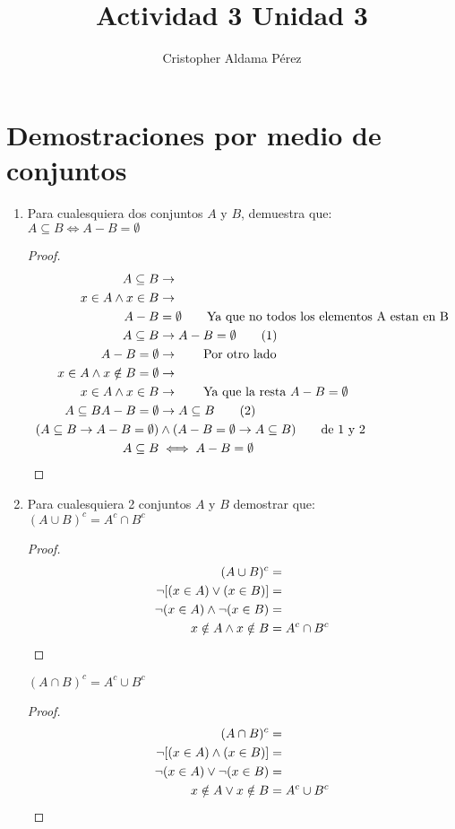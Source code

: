 \documentclass[a4paper,10pt]{article}
\title{Actividad 3 Unidad 3}
\author{Cristopher Aldama Pérez}
\begin{document}
\maketitle

\section{Demostraciones por medio de conjuntos}

\begin{enumerate}
 \item Para cualesquiera dos conjuntos $A$ y $B$, demuestra que:
 \\ $A \subseteq B \iff A - B = \emptyset $
 \begin{proof}
  \begin{align*}
  A \subseteq B &\to
  \\ x \in A \land x \in B &\to
  \\A - B &= \emptyset \tag*{Ya que no todos los elementos A estan en B}
  \\A \subseteq B &\to A - B = \emptyset \tag{1}
  \\A - B = \emptyset&\to \tag*{Por otro lado}
  \\x \in A \land x \notin B = \emptyset&\to
  \\ x \in A \land x \in B&\to     \tag*{Ya que la resta $A - B = \emptyset$}
  \\ A \subseteq B
  A - B = \emptyset &\to A \subseteq B \tag{2}
  \\(A \subseteq B \to A - B = \emptyset) &\land (A - B = \emptyset \to A \subseteq B) \tag*{de 1 y 2}
  \\A \subseteq B &\iff A - B = \emptyset \qedhere
  \end{align*}
 \end{proof}

 \item Para cualesquiera 2 conjuntos $A$ y $B$ demostrar que:
 \\ $(A \cup B)^c = A^c \cap B^c$
\begin{proof}
  \begin{align*}
  (A \cup B)^c &=
  \\ \neg[(x \in A) \lor (x \in B)] &=
  \\ \neg(x \in A) \land \neg(x\in B) &=
  \\ x \notin A \land x \notin B &=
     A^c \cap B^c \qedhere
  \end{align*}
 \end{proof}
 $(A \cap B)^c = A^c \cup B^c $
\begin{proof}
  \begin{align*}
  (A \cap B)^c &=
  \\ \neg[(x \in A) \land (x \in B)] &=
  \\ \neg(x \in A) \lor \neg(x\in B) &=
  \\ x \notin A \lor x \notin B &=
     A^c \cup B^c \qedhere
  \end{align*}
 \end{proof}
 

\end{enumerate}
\end{document}
